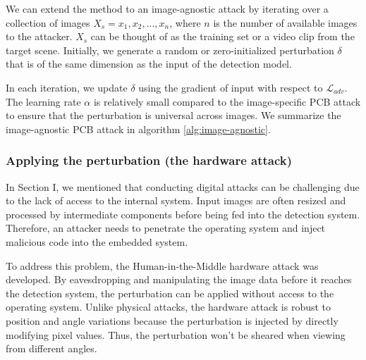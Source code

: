 We can extend the method to an image-agnostic attack by iterating over a collection of images $X_{s} = {x_{1}, x_{2}, ..., x_{n}}$, where $n$ is the number of available images to the attacker. $X_{s}$ can be thought of as the training set or a video clip from the target scene. Initially, we generate a random or zero-initialized perturbation $\delta$ that is of the same dimension as the input of the detection model. 

In each iteration, we update $\delta$ using the gradient of input with respect to $\mathcal{L}_{adv}$. The learning rate $\alpha$ is relatively small compared to the image-specific PCB attack to ensure that the perturbation is universal across images. We summarize the image-agnostic PCB attack in algorithm \ref{alg:image-agnostic}.


\subsubsection{Applying the perturbation (the hardware attack)}

In Section I, we mentioned that conducting digital attacks can be challenging due to the lack of access to the internal system. Input images are often resized and processed by intermediate components before being fed into the detection system. Therefore, an attacker needs to penetrate the operating system and inject malicious code into the embedded system. 


To address this problem, the Human-in-the-Middle  hardware attack was developed. By eavesdropping and manipulating the image data before it reaches the detection system, the perturbation can be applied without access to the operating system.  Unlike physical attacks, the hardware attack is robust to position and angle variations because the perturbation is injected by directly modifying pixel values. Thus, the perturbation won't be sheared when viewing from different angles.

